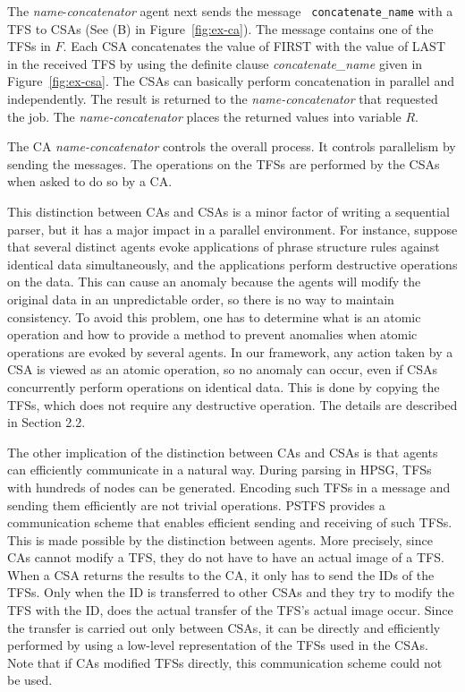 The {\it name}-{\it concatenator} agent next sends the message {\tt
concatenate\_name} with a TFS to CSAs (See (B) in
Figure~\ref{fig:ex-ca}).  The message contains one of the TFSs in $F$.
Each CSA concatenates the value of FIRST with the value of LAST in the
received TFS by using the definite clause {\it concatenate\_name}
given in Figure~\ref{fig:ex-csa}.  The CSAs can basically perform
concatenation in parallel and independently.  The result is returned
to the {\it name-concatenator} that requested the job.  The {\it
name-concatenator} places the returned values into variable $R$.

The CA {\it name-concatenator} controls the overall process. It
controls parallelism by sending the messages.  The operations on the
TFSs are performed by the CSAs when asked to do so by a CA.

This distinction between CAs and CSAs is a minor factor of writing a
sequential parser, but it has a major impact in a parallel
environment.  For instance, suppose that several distinct agents evoke
applications of phrase structure rules against identical data
simultaneously, and the applications perform destructive operations on
the data. This can cause an anomaly because the agents will modify
the original data in an unpredictable order, so there is no way to
maintain consistency. To avoid this problem, one has to determine what
is an atomic operation and how to provide a method to prevent
anomalies when atomic operations are evoked by several agents.  In our
framework, any action taken by a CSA is viewed as an atomic operation,
so no anomaly can occur, even if CSAs concurrently perform operations
on identical data.  This is done by copying the TFSs, which does not
require any destructive operation.  The details are described in
Section 2.2.

  The other implication of the distinction between CAs and CSAs is
that agents can efficiently communicate in a natural way.  During
parsing in HPSG, TFSs with hundreds of nodes can be generated.
Encoding such TFSs in a message and sending them efficiently are not
trivial operations. PSTFS provides a communication scheme that enables
efficient sending and receiving of such TFSs.  This is made possible
by the distinction between agents.  More precisely, since CAs cannot
modify a TFS, they do not have to have an actual image of a TFS.  When
a CSA returns the results to the CA, it only has to send the IDs of
the TFSs.  Only when the ID is transferred to other CSAs and they try
to modify the TFS with the ID, does the actual transfer of the TFS's
actual image occur. Since the transfer is carried out only between
CSAs, it can be directly and efficiently performed by using a
low-level representation of the TFSs used in the CSAs.  Note that if
CAs modified TFSs directly, this communication scheme could not be
used.


